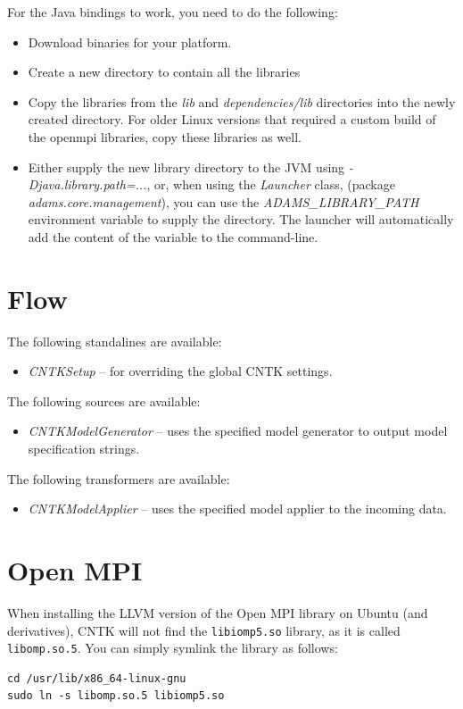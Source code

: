 \documentclass[a4paper]{book}
\begin{document}
\noindent For the Java bindings to work, you need to do the following:
\begin{itemize}
  \item Download binaries for your platform.
  \item Create a new directory to contain all the libraries
  \item Copy the libraries from the \textit{lib} and \textit{dependencies/lib}
  directories into the newly created directory. For older Linux versions that
  required a custom build of the openmpi libraries, copy these libraries as well.
  \item Either supply the new library directory to the JVM using
  \textit{-Djava.library.path=...}, or, when using the \textit{Launcher} class,
  (package \textit{adams.core.management}), you can use the
  \textit{ADAMS\_LIBRARY\_PATH} environment variable to supply the directory.
  The launcher will automatically add the content of the variable to the
  command-line.
\end{itemize}


\chapter{Flow}
The following standalines are available:
\begin{itemize}
  \item \textit{CNTKSetup} -- for overriding the global CNTK settings.
\end{itemize}
The following sources are available:
\begin{itemize}
  \item \textit{CNTKModelGenerator} -- uses the specified model generator
  to output model specification strings.
\end{itemize}
The following transformers are available:
\begin{itemize}
  \item \textit{CNTKModelApplier} -- uses the specified model applier to the
  incoming data.
\end{itemize}

\chapter{Open MPI}

When installing the LLVM version of the Open MPI library on Ubuntu (and
derivatives), CNTK will not find the \texttt{libiomp5.so} library, as it
is called \texttt{libomp.so.5}. You can simply symlink the library as
follows:
\begin{verbatim}
cd /usr/lib/x86_64-linux-gnu
sudo ln -s libomp.so.5 libiomp5.so
\end{verbatim}
\end{document}
